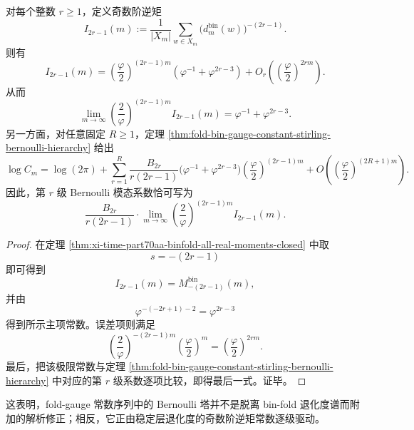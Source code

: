 \begin{corollary}\label{cor:xi-time-part70aa-bernoulli-coefficient-inverse-moment-interpretation}
对每个整数 \(r\ge 1\)，定义奇数阶逆矩
\[
I_{2r-1}(m)
:=
\frac{1}{|X_m|}
\sum_{w\in X_m}\bigl(d_m^{\mathrm{bin}}(w)\bigr)^{-(2r-1)}.
\]
则有
\[
\boxed{\;
I_{2r-1}(m)
=
\left(\frac{\varphi}{2}\right)^{(2r-1)m}
\left(
\varphi^{-1}+\varphi^{2r-3}
\right)
+
O_r\!\left(
\left(\frac{\varphi}{2}\right)^{2rm}
\right).\;}
\]
从而
\[
\boxed{\;
\lim_{m\to\infty}
\left(\frac{2}{\varphi}\right)^{(2r-1)m}
I_{2r-1}(m)
=
\varphi^{-1}+\varphi^{2r-3}.\;}
\]
另一方面，对任意固定 \(R\ge 1\)，定理 \ref{thm:fold-bin-gauge-constant-stirling-bernoulli-hierarchy} 给出
\[
\log C_m
=
\log(2\pi)
+
\sum_{r=1}^{R}
\frac{B_{2r}}{r(2r-1)}
\bigl(\varphi^{-1}+\varphi^{2r-3}\bigr)
\left(\frac{\varphi}{2}\right)^{(2r-1)m}
+
O\!\left(\left(\frac{\varphi}{2}\right)^{(2R+1)m}\right).
\]
因此，第 \(r\) 级 Bernoulli 模态系数恰可写为
\[
\frac{B_{2r}}{r(2r-1)}
\cdot
\lim_{m\to\infty}
\left(\frac{2}{\varphi}\right)^{(2r-1)m}
I_{2r-1}(m).
\]
\end{corollary}
\begin{proof}
在定理 \ref{thm:xi-time-part70aa-binfold-all-real-moments-closed} 中取
\[
s=-(2r-1)
\]
即可得到
\[
I_{2r-1}(m)=M_{-(2r-1)}^{\mathrm{bin}}(m),
\]
并由
\[
\varphi^{-(-2r+1)-2}=\varphi^{2r-3}
\]
得到所示主项常数。误差项则满足
\[
\left(\frac{2}{\varphi}\right)^{-(2r-1)m}
\left(\frac{\varphi}{2}\right)^m
=
\left(\frac{\varphi}{2}\right)^{2rm}.
\]
最后，把该极限常数与定理 \ref{thm:fold-bin-gauge-constant-stirling-bernoulli-hierarchy} 中对应的第 \(r\) 级系数逐项比较，即得最后一式。证毕。
\end{proof}

\noindent
这表明，fold-gauge 常数序列中的 Bernoulli 塔并不是脱离 bin-fold 退化度谱而附加的解析修正；相反，它正由稳定层退化度的奇数阶逆矩常数逐级驱动。

\endinput
